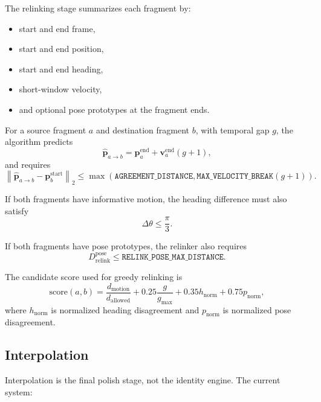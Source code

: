 \documentclass[11pt]{article}
\newcommand{\runtimekey}[1]{\texttt{#1}}
\begin{document}
The relinking stage summarizes each fragment by:

\begin{itemize}
  \item start and end frame,
  \item start and end position,
  \item start and end heading,
  \item short-window velocity,
  \item and optional pose prototypes at the fragment ends.
\end{itemize}

For a source fragment $a$ and destination fragment $b$, with temporal gap $g$, the algorithm predicts
\begin{equation}
  \hat{\mathbf{p}}_{a \rightarrow b} =
  \mathbf{p}^{\text{end}}_a + \mathbf{v}^{\text{end}}_a (g+1),
\end{equation}
and requires
\begin{equation}
  \left\lVert
  \hat{\mathbf{p}}_{a \rightarrow b} - \mathbf{p}^{\text{start}}_b
  \right\rVert_2
  \leq
  \max\!\left(
    \runtimekey{AGREEMENT\_DISTANCE},
    \runtimekey{MAX\_VELOCITY\_BREAK}(g+1)
  \right).
\end{equation}

If both fragments have informative motion, the heading difference must also satisfy
\begin{equation}
  \Delta\theta \leq \frac{\pi}{3}.
\end{equation}

If both fragments have pose prototypes, the relinker also requires
\begin{equation}
  D^{\text{pose}}_{\text{relink}} \leq \runtimekey{RELINK\_POSE\_MAX\_DISTANCE}.
\end{equation}

The candidate score used for greedy relinking is
\begin{equation}
  \text{score}(a,b) =
  \frac{d_{\text{motion}}}{d_{\text{allowed}}}
  + 0.25\frac{g}{g_{\max}}
  + 0.35 h_{\text{norm}}
  + 0.75 p_{\text{norm}},
\end{equation}
where $h_{\text{norm}}$ is normalized heading disagreement and $p_{\text{norm}}$ is normalized pose disagreement.

\subsection{Interpolation}

Interpolation is the final polish stage, not the identity engine. The current system:
\end{document}
